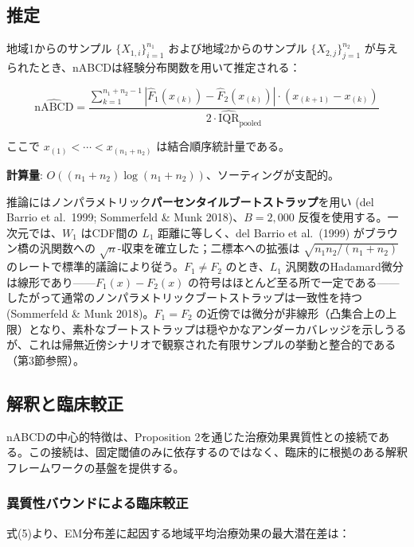 \documentclass[
  a4paper,
  11pt]{ltjsarticle}
\begin{document}
\subsection{推定}\label{ux63a8ux5b9a}

地域1からのサンプル \(\{X_{1,i}\}_{i=1}^{n_1}\)
および地域2からのサンプル \(\{X_{2,j}\}_{j=1}^{n_2}\)
が与えられたとき、nABCDは経験分布関数を用いて推定される：

\[\widehat{\text{nABCD}} = \frac{\sum_{k=1}^{n_1+n_2-1} |\hat{F}_1(x_{(k)}) - \hat{F}_2(x_{(k)})| \cdot (x_{(k+1)} - x_{(k)})}{2 \cdot \widehat{\text{IQR}}_{\text{pooled}}} \tag{6}\]

ここで \(x_{(1)} < \cdots < x_{(n_1+n_2)}\) は結合順序統計量である。

\textbf{計算量}:
\(O((n_1 + n_2) \log(n_1 + n_2))\)、ソーティングが支配的。

推論にはノンパラメトリック\textbf{パーセンタイルブートストラップ}を用い
(del Barrio et al.~1999; Sommerfeld \& Munk 2018)、\(B = 2{,}000\)
反復を使用する。一次元では、\(W_1\) はCDF間の \(L_1\) 距離に等しく、del
Barrio et al.~(1999) がブラウン橋の汎関数への
\(\sqrt{n}\)-収束を確立した；二標本への拡張は
\(\sqrt{n_1 n_2/(n_1+n_2)}\)
のレートで標準的議論により従う。\(F_1 \neq F_2\) のとき、\(L_1\)
汎関数のHadamard微分は線形であり------\(F_1(x)-F_2(x)\)
の符号はほとんど至る所で一定である------したがって通常のノンパラメトリックブートストラップは一致性を持つ
(Sommerfeld \& Munk 2018)。\(F_1 = F_2\)
の近傍では微分が非線形（凸集合上の上限）となり、素朴なブートストラップは穏やかなアンダーカバレッジを示しうるが、これは帰無近傍シナリオで観察された有限サンプルの挙動と整合的である（第3節参照）。

\subsection{解釈と臨床較正}\label{ux89e3ux91c8ux3068ux81e8ux5e8aux8f03ux6b63}

nABCDの中心的特徴は、Proposition
2を通じた治療効果異質性との接続である。この接続は、固定閾値のみに依存するのではなく、臨床的に根拠のある解釈フレームワークの基盤を提供する。

\subsubsection{異質性バウンドによる臨床較正}\label{ux7570ux8ceaux6027ux30d0ux30a6ux30f3ux30c9ux306bux3088ux308bux81e8ux5e8aux8f03ux6b63}

式(5)より、EM分布差に起因する地域平均治療効果の最大潜在差は：
\end{document}
